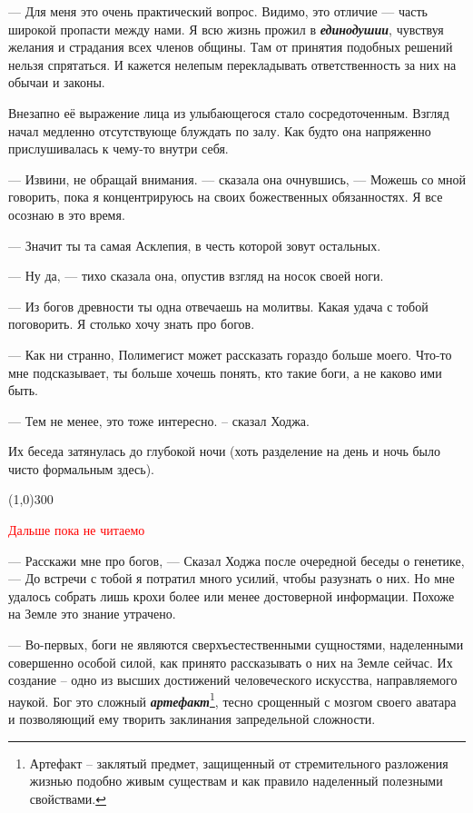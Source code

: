 \documentclass[12pt,a4paper]{article}
\newcommand{\tr}[1]{\textcolor{red}{#1}}
\newcommand{\sep}{
	\begin{center}
		\line(1,0){300}
	\end{center}
}
\begin{document}
--- Для меня это очень практический вопрос. Видимо, это отличие --- часть широкой пропасти между нами. Я всю жизнь прожил в \textbf{\textit{единодушии}}, чувствуя желания и страдания всех членов общины. Там от принятия подобных решений нельзя спрятаться. И кажется нелепым перекладывать ответственность за них на обычаи и законы.

Внезапно её выражение лица из улыбающегося стало сосредоточенным. Взгляд начал медленно отсутствующе блуждать по залу. Как будто она напряженно прислушивалась к чему-то внутри себя.

--- Извини, не обращай внимания. --- сказала она очнувшись, --- Можешь со мной говорить, пока я концентрируюсь на своих божественных обязанностях. Я все осознаю в это время.

--- Значит ты та самая Асклепия, в честь которой зовут остальных.

--- Ну да, --- тихо сказала она, опустив взгляд на носок своей ноги.

--- Из богов древности ты одна отвечаешь на молитвы. Какая удача с тобой поговорить. Я столько хочу знать про богов.

--- Как ни странно, Полимегист может рассказать гораздо больше моего. Что-то мне подсказывает, ты больше хочешь понять, кто такие боги, а не каково ими быть.

--- Тем не менее, это тоже интересно. -- сказал Ходжа.

Их беседа затянулась до глубокой ночи (хоть разделение на день и ночь было чисто формальным здесь).


\sep


\tr{\Large \center Дальше пока не читаемо}
\newpage

--- Расскажи мне про богов, --- Сказал Ходжа после очередной беседы о генетике, --- До встречи с тобой я потратил много усилий, чтобы разузнать о них. Но мне удалось собрать лишь крохи более или менее достоверной информации. Похоже на Земле это знание утрачено.

--- Во-первых, боги не являются сверхъестественными сущностями, наделенными совершенно особой силой, как принято рассказывать о них на Земле сейчас. Их создание -- одно из высших достижений человеческого искусства, направляемого наукой. Бог это сложный \textbf{\textit{артефакт}}\footnote{Артефакт -- заклятый предмет, защищенный от стремительного разложения жизнью подобно живым существам и как правило наделенный полезными свойствами.}, тесно срощенный с мозгом своего аватара и позволяющий ему творить заклинания запредельной сложности.
\end{document}
